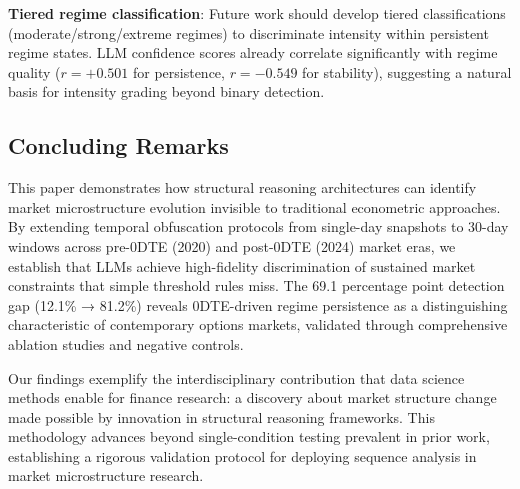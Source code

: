 \textbf{Tiered regime classification}: Future work should develop tiered classifications (moderate/strong/extreme regimes) to discriminate intensity within persistent regime states. LLM confidence scores already correlate significantly with regime quality ($r = +0.501$ for persistence, $r = -0.549$ for stability), suggesting a natural basis for intensity grading beyond binary detection.

\subsection{Concluding Remarks}

This paper demonstrates how structural reasoning architectures can identify market microstructure evolution invisible to traditional econometric approaches. By extending temporal obfuscation protocols from single-day snapshots to 30-day windows across pre-0DTE (2020) and post-0DTE (2024) market eras, we establish that LLMs achieve high-fidelity discrimination of sustained market constraints that simple threshold rules miss. The 69.1 percentage point detection gap (12.1\% → 81.2\%) reveals 0DTE-driven regime persistence as a distinguishing characteristic of contemporary options markets, validated through comprehensive ablation studies and negative controls.

Our findings exemplify the interdisciplinary contribution that data science methods enable for finance research: a discovery about market structure change made possible by innovation in structural reasoning frameworks. This methodology advances beyond single-condition testing prevalent in prior work, establishing a rigorous validation protocol for deploying sequence analysis in market microstructure research.
